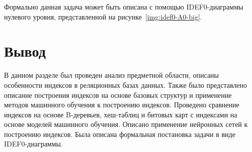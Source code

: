 Формально данная задача может быть описана с помощью IDEF0-диаграммы нулевого
уровня, представленной на рисунке~\ref{img:idef0-A0-big}.


\section*{Вывод}

В данном разделе был проведен анализ предметной области, описаны особенности
индексов в реляционных базах данных. Также было представлено описание построения
индексов на основе базовых структур и применение методов машинного обучения к
построению индексов. Проведено сравнение индексов на основе B-деревьев,
хеш-таблиц и битовых карт с индексами на основе моделей машинного обучения.
Описано применение нейронных сетей к построению индексов. Была описана
формальная постановка задачи в виде IDEF0-диаграммы.

